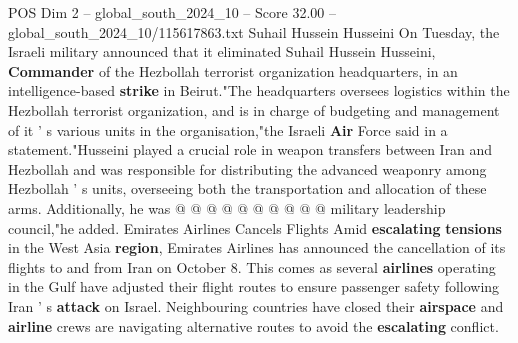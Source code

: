 \begin{textsample}{POS Dim 2 – global\_south\_2024\_10 – Score 32.00 – global\_south\_2024\_10/115617863.txt}
Suhail Hussein Husseini On Tuesday, the Israeli military announced that it eliminated Suhail Hussein Husseini, \textbf{Commander} of the Hezbollah terrorist organization headquarters, in an intelligence-based \textbf{strike} in Beirut."The headquarters oversees logistics within the Hezbollah terrorist organization, and is in charge of budgeting and management of it ' s various units in the organisation,"the Israeli \textbf{Air} Force said in a statement."Husseini played a crucial role in weapon transfers between Iran and Hezbollah and was responsible for distributing the advanced weaponry among Hezbollah ' s units, overseeing both the transportation and allocation of these arms.
Additionally, he was @ @ @ @ @ @ @ @ @ @ military leadership council,"he added.
Emirates Airlines Cancels Flights Amid \textbf{escalating} \textbf{tensions} in the West Asia \textbf{region}, Emirates Airlines has announced the cancellation of its flights to and from Iran on October 8.
This comes as several \textbf{airlines} operating in the Gulf have adjusted their flight routes to ensure passenger safety following Iran ' s \textbf{attack} on Israel.
Neighbouring countries have closed their \textbf{airspace} and \textbf{airline} crews are navigating alternative routes to avoid the \textbf{escalating} conflict.

\end{textsample}

